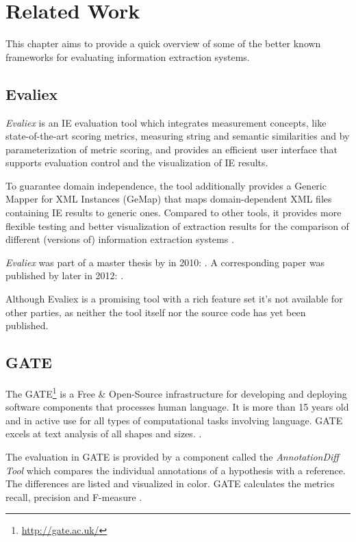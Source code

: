 \section{Related Work}
\label{sec:related-work}
This chapter aims to provide a quick overview of some of the better known frameworks for evaluating information extraction systems.


\subsection{Evaliex}
\textit{Evaliex} is an \gls{IE} evaluation tool which integrates measurement concepts, like state-of-the-art scoring metrics, measuring string and semantic similarities and by parameterization of metric scoring, and provides an efficient user interface that supports evaluation control and the visualization of \gls{IE} results.

To guarantee domain independence, the tool additionally provides a Generic Mapper for XML Instances (GeMap) that maps domain-dependent XML files containing \gls{IE} results to generic ones. Compared to other tools, it provides more flexible testing and better visualization of extraction results for the comparison of different (versions of) information extraction systems \cite{Feilmayr:2012}.

\textit{Evaliex}  was part of a master thesis by \citeauthor{Linsmayr:2010} in 2010:  \cite{Linsmayr:2010}. A corresponding paper was published by \citeauthor{Feilmayr:2012} later in 2012:  \cite{Feilmayr:2012}.

Although Evaliex is a promising tool with a rich feature set it's not available for other parties, as neither the tool itself nor the source code has yet been published.

\subsection{GATE}
The \gls{GATE}\footnote{\url{http://gate.ac.uk/}} is a Free \& Open-Source infrastructure for developing and deploying software components that processes human language. It is more than 15 years old and in active use for all types of computational tasks involving language. GATE excels at text analysis of all shapes and sizes. \cite{Cunningham:2011}. 

The evaluation in GATE is provided by a component called the \textit{AnnotationDiff Tool} which compares the individual annotations of a hypothesis with a reference. The differences are listed and visualized in color. GATE calculates the metrics recall, precision and F-measure \cite{Linsmayr:2010}.

